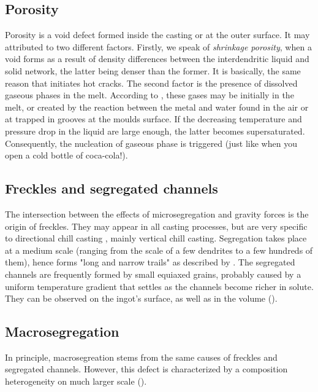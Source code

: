 \subsection*{Porosity}
Porosity is a void defect formed inside the casting or at the outer surface. It may attributed to two different factors.
Firstly, we speak of \emph{shrinkage porosity}, when a void forms as a result of density differences between the interdendritic liquid and solid
network, the latter being denser than the former. It is basically, the same reason that initiates hot cracks. 
The second factor is the presence of dissolved gaseous phases in the melt. According to \citet{dantzig_solidification_2009}, these gases may be initially in the melt, or created by the reaction between the metal and water found in the air or at trapped in grooves at the moulds surface. If the decreasing temperature and pressure drop in the liquid are large enough, the latter becomes supersaturated. Consequently, the nucleation of gaseous phase is triggered (just like when you open a cold bottle of coca-cola!).

\subsection*{Freckles and segregated channels} 
The intersection between the effects of microsegregation and gravity forces is the origin of freckles. They may appear 
in all casting processes, but are very specific to directional chill casting \citep{giamei_nature_1970}, mainly vertical chill casting. 
Segregation takes place at a medium scale (ranging from the scale of a few dendrites to a few hundreds of them), hence forms "long and narrow trails" as described by \citet{felicelli_simulation_1991}. The segregated channels are frequently formed by small equiaxed grains, probably caused by a uniform temperature
gradient that settles as the channels become richer in solute. They can be observed on the ingot's surface, as well as in the volume ().

\subsection*{Macrosegregation}
In principle, macrosegreation stems from the same causes of freckles and segregated channels. However, this defect is characterized by a composition heterogeneity on much larger scale (). 


